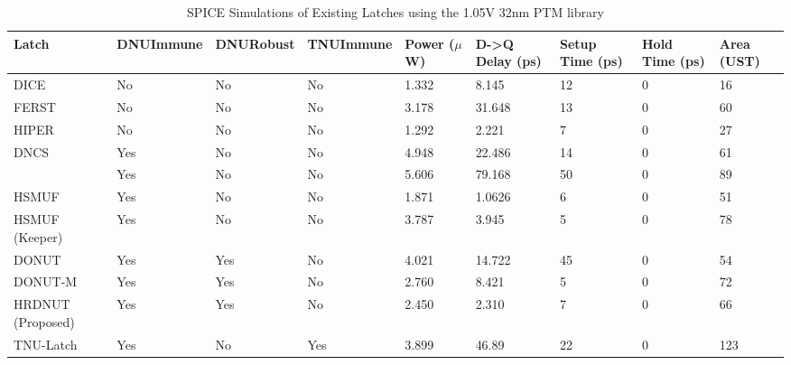 \begin{table}[t]
	\begin{center}
		\caption{SPICE Simulations of Existing Latches using the 1.05V 32nm PTM library }
		\label{table:rtable}
		\begin{tabular}{|m{7em}|m{3.5em}|m{3em}|m{3.5em}|m{2.5em}|m{3.5em}|m{3.5em}|m{3.5em}|m{2em}|}
			\hline
			Latch & DNU\newline Immune & DNU\newline Robust & TNU\newline Immune & Power ($\mu$W) & D-\textgreater Q Delay (ps) & Setup Time (ps) & Hold Time (ps) & Area (UST)\\ 
			\hline
			DICE & No & No & No & 1.332 & 8.145 & 12 & 0 & 16 \\
			\hline
			FERST & No & No & No & 3.178 & 31.648 & 13 & 0 & 60 \\
			\hline
			HIPER & No & No & No & 1.292 & 2.221 & 7 & 0 & 27 \\
			\hhline{|=|=|=|=|=|=|=|=|=|}
			DNCS & Yes & No & No & 4.948 & 22.486 & 14 & 0 & 61 \\
			\hline
			\cite{Inter} & Yes & No & No & 5.606 & 79.168 & 50 & 0 & 89 \\
			\hline
			HSMUF & Yes & No & No & 1.871 & 1.0626 & 6 & 0 & 51 \\
			\hline
			HSMUF (Keeper) & Yes & No & No & 3.787 & 3.945 & 5 & 0 & 78 \\
			\hhline{|=|=|=|=|=|=|=|=|=|}
			DONUT \cite{DONUT} & Yes & Yes & No & 4.021 & 14.722 & 45 & 0 & 54 \\ 
			\hline
			DONUT-M & Yes & Yes & No & 2.760 & 8.421 & 5 & 0 & 72\\
			\hline
			HRDNUT (Proposed) & Yes & Yes & No & 2.450 & 2.310 & 7 & 0 & 66 \\
			\hline
			TNU-Latch & Yes & No & Yes & 3.899 & 46.89 & 22 & 0 & 123 \\
			\hline
		\end{tabular}
	\end{center}
\end{table}
\raggedbottom

